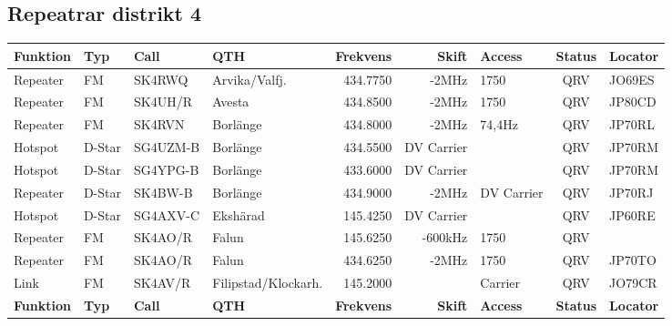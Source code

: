 \documentclass[10pt,swedish,a4paper,twoside]{article}
\begin{document}
\begin{landscape}
\subsection{Repeatrar distrikt 4}
\footnotesize
\begin{longtable}{llllrrlcl}
	\textbf{Funktion} & \textbf{Typ} & \textbf{Call} & \textbf{QTH}        & \textbf{Frekvens} & \textbf{Skift} & \textbf{Access} & \textbf{Status} & \textbf{Locator} \\ \hline
	Repeater          & FM           & SK4RWQ        & Arvika/Valfj.       &          434.7750 &          -2MHz & 1750            &       QRV       & JO69ES           \\
	Repeater          & FM           & SK4UH/R       & Avesta              &          434.8500 &          -2MHz & 1750            &       QRV       & JP80CD           \\
	Repeater          & FM           & SK4RVN        & Borlänge            &          434.8000 &          -2MHz & 74,4Hz          &       QRV       & JP70RL           \\
	Hotspot           & D-Star       & SG4UZM-B      & Borlänge            &          434.5500 &     DV Carrier &                 &       QRV       & JP70RM           \\
	Hotspot           & D-Star       & SG4YPG-B      & Borlänge            &          433.6000 &     DV Carrier &                 &       QRV       & JP70RM           \\
	Repeater          & D-Star       & SK4BW-B       & Borlänge            &          434.9000 &          -2MHz & DV Carrier      &       QRV       & JP70RJ           \\
	Hotspot           & D-Star       & SG4AXV-C      & Ekshärad            &          145.4250 &     DV Carrier &                 &       QRV       & JP60RE           \\
	Repeater          & FM           & SK4AO/R       & Falun               &          145.6250 &        -600kHz & 1750            &       QRV       &  \\
	Repeater          & FM           & SK4AO/R       & Falun               &          434.6250 &          -2MHz & 1750            &       QRV       & JP70TO           \\
	Link              & FM           & SK4AV/R       & Filipstad/Klockarh. &          145.2000 &                & Carrier         &       QRV       & JO79CR           \\
	\textbf{Funktion} & \textbf{Typ} & \textbf{Call} & \textbf{QTH}        & \textbf{Frekvens} & \textbf{Skift} & \textbf{Access} & \textbf{Status} & \textbf{Locator} \\ \hline

\end{longtable}
\end{landscape}
\end{document}

